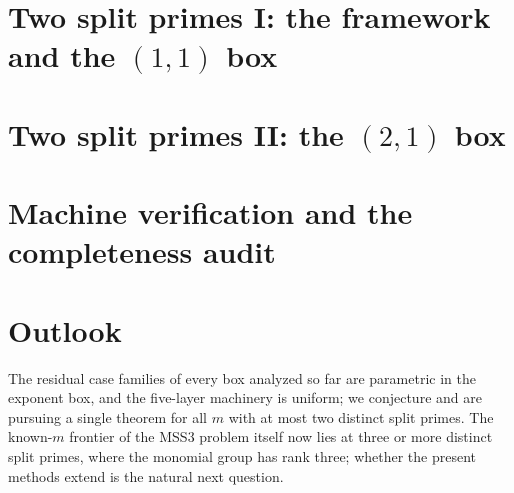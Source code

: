 \documentclass[11pt]{amsart}
\theoremstyle{definition}
\begin{document}
\section{Two split primes I: the framework and the $(1,1)$ box}
\label{sec:pq}


\section{Two split primes II: the $(2,1)$ box}\label{sec:p2q}


\section{Machine verification and the completeness audit}
\label{sec:methodology}


\section{Outlook}\label{sec:outlook}

The residual case families of every box analyzed so far are
parametric in the exponent box, and the five-layer machinery is
uniform; we conjecture and are pursuing a single theorem for all
$m$ with at most two distinct split primes. The known-$m$ frontier
of the MSS3 problem itself now lies at three or more distinct
split primes, where the monomial group has rank three; whether the
present methods extend is the natural next question.
\end{document}
